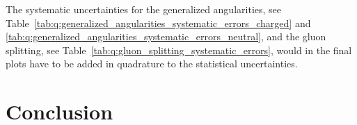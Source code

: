 The systematic uncertainties for the generalized angularities, see Table~\ref{tab:q:generalized_angularities_systematic_errors_charged} and \ref{tab:q:generalized_angularities_systematic_errors_neutral}, and the gluon splitting, see Table~\ref{tab:q:gluon_splitting_systematic_errors}, would in the final plots have to be added in quadrature to the statistical uncertainties. 
 


\section{Conclusion}
\label{sec:q:conclusion}


